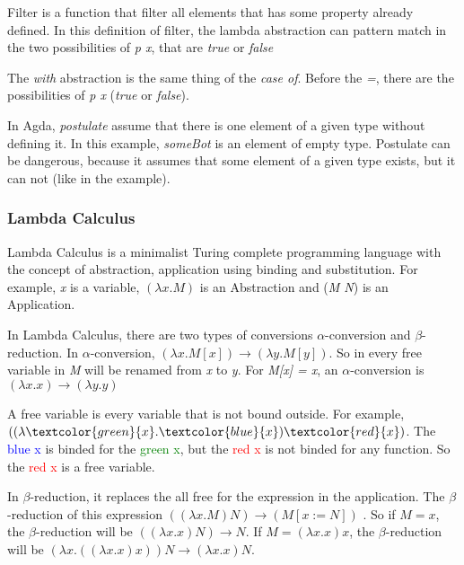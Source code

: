 

  Filter is a function that filter all elements that has some property already defined.
  In this definition of filter, the lambda abstraction can pattern match
  in the two possibilities of \emph{p x}, that are \emph{true} or \emph{false}


  The \emph{with} abstraction is the same thing of the \emph{case of}.
  Before the \emph{=}, there are the possibilities of \emph{p x} (\emph{true} or \emph{false}).


  In Agda, \emph{postulate} assume that there is one element of a given type without defining it.
  In this example, \emph{someBot} is an element of empty type.
  Postulate can be dangerous, because it assumes that some element of a given type exists,
  but it can not (like in the example).

  \subsubsection{Lambda Calculus}
  Lambda Calculus is a minimalist Turing complete programming language with the concept of abstraction,
  application using binding and substitution. For example, \emph{x} is a variable, $(\lambda x.M)$
  is an Abstraction and (\emph{M N}) is an Application.

  In Lambda Calculus, there are two types of conversions $\alpha$-conversion and $\beta$-reduction.
  In $\alpha$-conversion, $(\lambda x.M[x]) \rightarrow (\lambda y.M[y])$.
  So in every free variable in \emph{M} will be renamed from \emph{x} to \emph{y}.
  For \emph{M[x] = x}, an $\alpha$-conversion is $(\lambda x.x) \rightarrow (\lambda y.y)$

  A free variable is every variable that is not bound outside.
  For example, $((\lambda\textcolor{green}{x}.\textcolor{blue}{x}) \textcolor{red}{x})$.
  The \textcolor{blue}{blue x} is binded for the \textcolor{green}{green x},
  but the \textcolor{red}{red x}
  is not binded for any function. So the \textcolor{red}{red x} is a free variable.

  In $\beta$-reduction, it replaces the all free for the expression in the application.
  The $\beta$-reduction of this expression $((\lambda x.M) N) \rightarrow (M[x := N])$ .
  So if $M = x$, the $\beta$-reduction will be $((\lambda x.x) N) \rightarrow N$.
  If $M = (\lambda x.x) x$, the $\beta$-reduction will be
  $(\lambda x.((\lambda x.x)x))N \rightarrow (\lambda x.x)N$.

